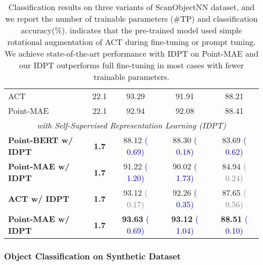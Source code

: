 \documentclass[10pt,twocolumn,letterpaper]{article}
\begin{document}
\begin{table}[t]
{\begin{tabular}{lcccc}
    ACT\textcolor{red}{} \cite{dong2022autoencoders}   & 22.1  & 93.29 & 91.91  & 88.21 \\
    Point-MAE\textcolor{red}{} \cite{pang2022masked}  & 22.1  & 92.94 & 92.08 & 88.41 \\ 
    \midrule
    \multicolumn{5}{c}{\textit{with Self-Supervised Representation Learning (IDPT)}} \\
    \midrule
    \rowcolor{mycolor} \textbf{Point-BERT w/ IDPT} & \textbf{1.7} &  88.12 \textcolor{blue}{( 0.69)}   & 88.30 \textcolor{blue}{( 0.18)}      & 83.69 \textcolor{blue}{( 0.62)} \\
    \rowcolor{mycolor} \textbf{Point-MAE w/ IDPT} & \textbf{1.7} & 91.22 \textcolor{blue}{( 1.20)} & 90.02 \textcolor{blue}{( 1.73)} & 84.94 \textcolor{gray}{( 0.24)} \\
    \rowcolor{mycolor} \textbf{ACT\textcolor{red}{} w/ IDPT} & \textbf{1.7}  & 93.12 \textcolor{gray}{( 0.17)} & 92.26 \textcolor{blue}{( 0.35)} & 87.65 \textcolor{gray}{( 0.56)} \\ 
    \rowcolor{mycolor} \textbf{Point-MAE\textcolor{red}{} w/ IDPT} & \textbf{1.7} & \textbf{93.63} \textcolor{blue}{( 0.69)} & \textbf{93.12} \textcolor{blue}{( 1.04)} & \textbf{88.51} \textcolor{blue}{( 0.10)} \\ 
    \bottomrule
    \end{tabular}}
  \caption{Classification results on three variants of ScanObjectNN dataset, and we report the number of trainable parameters (\#TP) and classification accuracy(\%). \textcolor{red}{} indicates that the pre-trained model used simple rotational augmentation of ACT \cite{dong2022autoencoders} during fine-tuning or prompt tuning. We achieve state-of-the-art performance with IDPT on Point-MAE\textcolor{red}{} and our IDPT outperforms full fine-tuning in most cases with fewer trainable parameters.}
  \label{table1}\end{table}

\subsubsection{Object Classification on Synthetic Dataset} 
\end{document}
